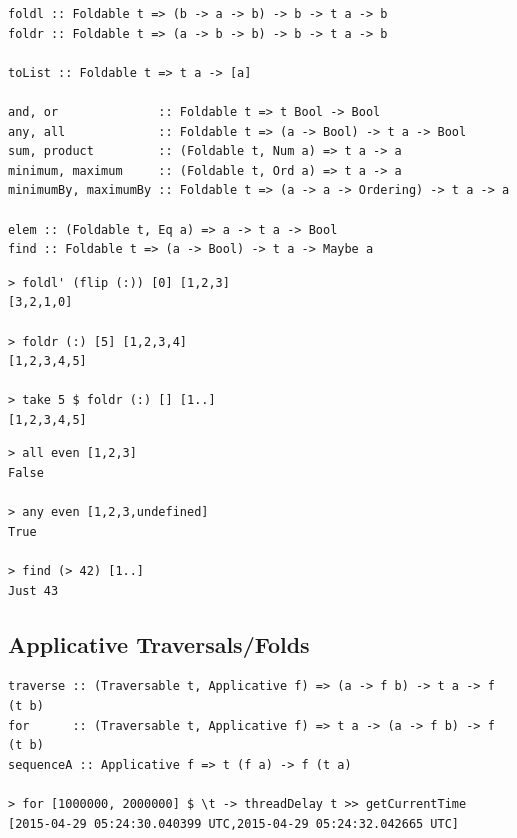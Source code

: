 \begin{box1}
\begin{multicols}{4}
\end{multicols}

\begin{verbatim}
foldl :: Foldable t => (b -> a -> b) -> b -> t a -> b	
foldr :: Foldable t => (a -> b -> b) -> b -> t a -> b	

toList :: Foldable t => t a -> [a]	

and, or              :: Foldable t => t Bool -> Bool	
any, all             :: Foldable t => (a -> Bool) -> t a -> Bool	
sum, product         :: (Foldable t, Num a) => t a -> a	
minimum, maximum     :: (Foldable t, Ord a) => t a -> a	
minimumBy, maximumBy :: Foldable t => (a -> a -> Ordering) -> t a -> a

elem :: (Foldable t, Eq a) => a -> t a -> Bool	
find :: Foldable t => (a -> Bool) -> t a -> Maybe a
\end{verbatim}

\begin{multicols}{2}
\begin{verbatim}
> foldl' (flip (:)) [0] [1,2,3]
[3,2,1,0]

> foldr (:) [5] [1,2,3,4]
[1,2,3,4,5]

> take 5 $ foldr (:) [] [1..]
[1,2,3,4,5]
\end{verbatim}

\columnbreak

\begin{verbatim}
> all even [1,2,3]
False

> any even [1,2,3,undefined]
True

> find (> 42) [1..]
Just 43
\end{verbatim}
\end{multicols}
\end{box1}

\begin{box2}
\subsection *{Applicative Traversals/Folds}

\begin{verbatim}
traverse :: (Traversable t, Applicative f) => (a -> f b) -> t a -> f (t b)
for      :: (Traversable t, Applicative f) => t a -> (a -> f b) -> f (t b)
sequenceA :: Applicative f => t (f a) -> f (t a)

> for [1000000, 2000000] $ \t -> threadDelay t >> getCurrentTime
[2015-04-29 05:24:30.040399 UTC,2015-04-29 05:24:32.042665 UTC]
\end{verbatim}
\end{box2}

